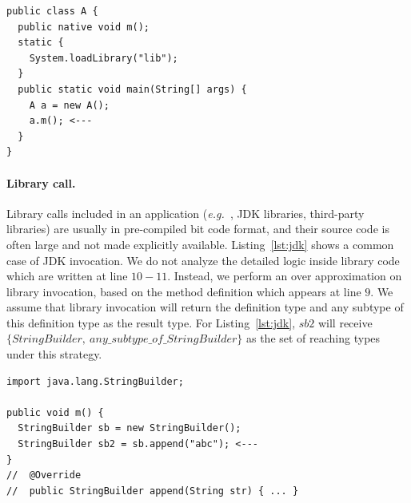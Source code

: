 \documentclass{fac}
\newcommand\eg{\textit{e.g.\ }}
\begin{document}
\begin{minipage}{\linewidth}
\begin{lstlisting}[caption={Example code of JNI},label={lst:jni}]
public class A {
  public native void m();
  static {
    System.loadLibrary("lib");
  }
  public static void main(String[] args) {
    A a = new A();
    a.m(); <---
  }
}
\end{lstlisting}
\end{minipage}


\paragraph{Library call.} Library calls included in an application (\eg, JDK libraries, third-party libraries) are usually in pre-compiled bit code format, and their source code is often large and not made explicitly available. Listing~\ref{lst:jdk} shows a common case of JDK invocation. We do not analyze the detailed logic inside library code which are written at line $10-11$. Instead, we perform an over approximation on library invocation, based on the method definition which appears at line $9$. We assume that library invocation will return the definition type and any subtype of this definition type as the result type. For Listing~\ref{lst:jdk}, $sb2$ will receive $\{StringBuilder,\ any\_subtype\_of\_StringBuilder\}$ as the set of reaching types under this strategy.

\begin{minipage}{\linewidth}
\begin{lstlisting}[caption={Example of JDK library call},label={lst:jdk}]
import java.lang.StringBuilder;

public void m() {
  StringBuilder sb = new StringBuilder();
  StringBuilder sb2 = sb.append("abc"); <---
}
//  @Override
//  public StringBuilder append(String str) { ... }
\end{lstlisting}
\end{minipage}

\end{document}
